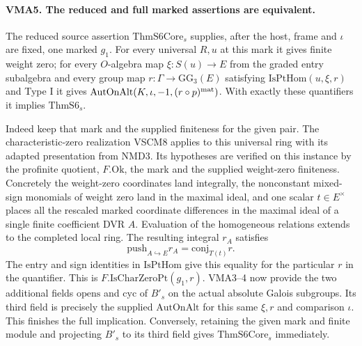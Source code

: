 \paragraph{VMA5. The reduced and full marked assertions are equivalent.}
\label{claim:VMA5}
The reduced source assertion $\mathrm{ThmS6Core}_s$ supplies,
after the host, frame and $\iota$ are fixed, one marked $g_1$.
For every universal $R,u$ at this mark it gives finite weight zero;
for every $O$-algebra map $\xi:S(u)\to E$ from the graded
entry subalgebra and every group map $r:\Gamma\to\mathrm{GG}_3(E)$
satisfying $\mathrm{IsPtHom}(u,\xi,r)$ and Type I it gives
$\mathrm{AutOnAlt}(K,\iota,-1,(r\circ p)^{\rm mat})$.
With exactly these quantifiers it implies $\mathrm{ThmS6}_s$.

Indeed keep that mark and the supplied finiteness for the given pair.
The characteristic-zero realization VSCM8 applies to this universal
ring with its adapted presentation from NMD3. Its hypotheses are
verified on this instance by the profinite quotient, $F.\mathrm{Ok}$,
the mark and the supplied weight-zero finiteness. Concretely the
weight-zero coordinates land integrally, the nonconstant mixed-sign
monomials of weight zero land in the maximal ideal, and one scalar
$t\in E^\times$ places all the rescaled marked coordinate differences in the maximal ideal
of a single finite coefficient DVR $A$. Evaluation of the homogeneous
relations extends to the completed local ring. The resulting
integral $r_A$ satisfies
\[
     \mathrm{push}_{A\hookrightarrow E} r_A
                    =\mathrm{conj}_{T(t)} r.
\]
The entry and sign identities in $\mathrm{IsPtHom}$ give this equality
for the particular $r$ in the quantifier. This is
$F.\mathrm{IsCharZeroPt}(g_1,r)$. VMA3--4 now provide the two
additional fields $\mathrm{opens}$ and $\mathrm{cyc}$ of $B'_s$ on
the actual absolute Galois subgroups. Its third field is precisely
the supplied $\mathrm{AutOnAlt}$ for this same $\xi,r$ and comparison
$\iota$. This finishes the full implication. Conversely, retaining the
given mark and finite module and projecting $B'_s$ to its third field
gives $\mathrm{ThmS6Core}_s$ immediately.

